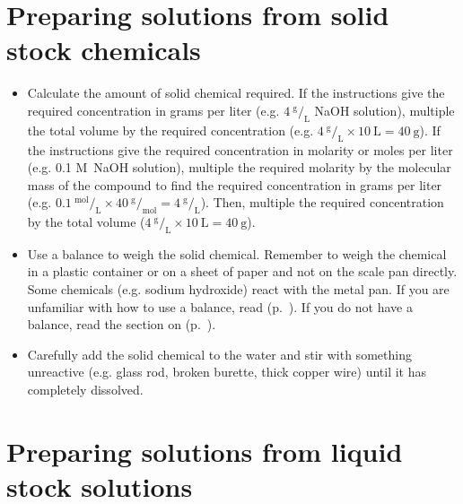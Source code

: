 \section{Preparing solutions from solid stock chemicals}

\begin{itemize}

\item{Calculate the amount of solid chemical required. If the instructions give the required concentration in grams per liter (e.g. $ 4~^\text{g}/_\text{L} $ NaOH solution), multiple the total volume by the required concentration (e.g. $ 4~^\text{g}/_\text{L} \times 10~\text{L} = 40~\text{g} $). If the instructions give the required concentration in molarity or moles per liter (e.g. 0.1 M~NaOH solution), multiple the required molarity by the molecular mass of the compound to find the required concentration in grams per liter (e.g. $ 0.1~ ^\text{mol}/_\text{L} \times 40~^\text{g}/_\text{mol} = 4~^\text{g}/_\text{L} $). Then, multiple the required concentration by the total volume ($ 4~^\text{g}/_\text{L} \times 10~\text{L} = 40~\text{g} $).}

\item{Use a balance to weigh the solid chemical. Remember to weigh the chemical in a plastic container or on a sheet of paper and not on the scale pan directly. Some chemicals (e.g. sodium hydroxide) react with the metal pan. If you are unfamiliar with how to use a balance, read  (p.~\pageref{cha:use-beam-balance}). If you do not have a balance, read the section on  (p.~\pageref{cha:prep-solns-wo-bal}).}

\item{Carefully add the solid chemical to the water and stir with something unreactive (e.g. glass rod, broken burette, thick copper wire) until it has completely dissolved.}

\end{itemize}

\section{Preparing solutions from liquid stock solutions}

